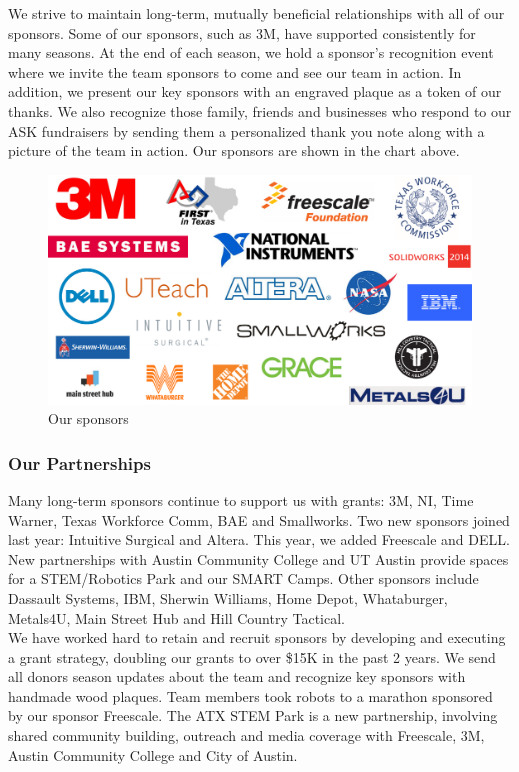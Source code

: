 We strive to maintain long-term, mutually beneficial relationships with all of our sponsors. Some of our sponsors, such as 3M, have supported consistently for many seasons. At the end of each season, we hold a sponsor’s recognition event where we invite the team sponsors to come and see our team in action. In addition, we present our key sponsors with an engraved plaque as a token of our thanks. We also recognize those family, friends and businesses who respond to our ASK fundraisers by sending them a personalized thank you note along with a picture of the team in action.  
Our sponsors are shown in the chart above.

\begin{figure}
	\color{darkgray}
	\centering
	\includegraphics[height=0.3\linewidth]{sponsors}
	\caption[]{Our sponsors}
	\label{fig:sponsors}
\end{figure}

\subsubsection{Our Partnerships}
Many long-term sponsors continue to support us with grants: 3M, NI, Time Warner, Texas Workforce Comm, BAE and Smallworks. Two new sponsors joined last year: Intuitive Surgical and Altera. This year, we added Freescale and DELL. New partnerships with Austin Community College and UT Austin provide spaces for a STEM/Robotics Park and our SMART Camps. Other sponsors include Dassault Systems, IBM, Sherwin Williams, Home Depot, Whataburger, Metals4U, Main Street Hub and Hill Country Tactical.\\

We have worked hard to retain and recruit sponsors by developing and executing a grant strategy, doubling our grants to over \$15K in the past 2 years. We send all donors season updates about the team and recognize key sponsors with handmade wood plaques. Team members took robots to a marathon sponsored by our sponsor Freescale. The ATX STEM Park is a new partnership, involving shared community building, outreach and media coverage with Freescale, 3M, Austin Community College and City of Austin.\\

